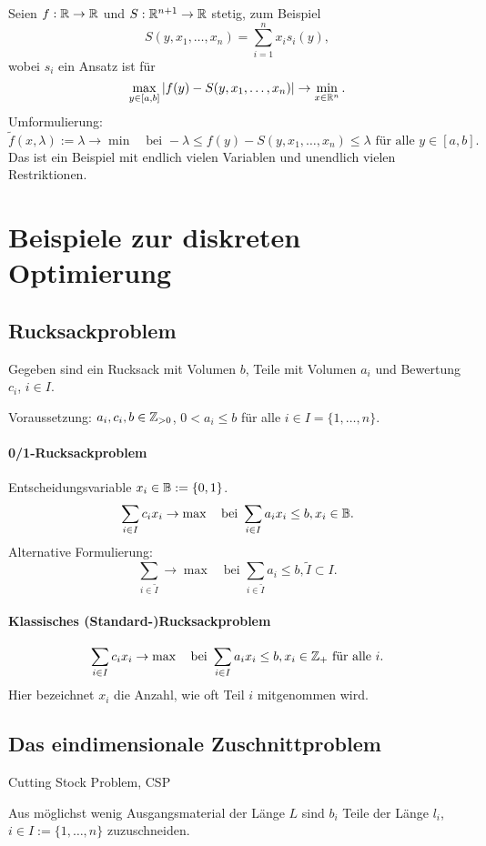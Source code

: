 Seien $f: \mathbb{R} \to \mathbb{R}$ und $S: \mathbb{R}^{n+1} \to \mathbb{R}$ stetig, zum Beispiel
\[ S(y, x_1, \ldots, x_n) = \sum_{i=1}^n x_i s_i(y), \]
wobei $s_i$ ein Ansatz ist für
\[ \max_{y \in [a,b]} | f(y) - S(y, x_1, \ldots, x_n) | \to \min_{x \in
    \mathbb{R}^n}. \]
Umformulierung:
\[ \tilde{f}(x,\lambda) := \lambda \to \min \quad \text{bei } - \lambda \le
  f(y) - S(y, x_1, \ldots, x_n) \le \lambda \text{ für alle } y \in [a,b]. \]
Das ist ein Beispiel mit endlich vielen Variablen und unendlich vielen
Restriktionen.

\section{Beispiele zur diskreten Optimierung}
\subsection{Rucksackproblem}
Gegeben sind ein Rucksack mit Volumen $b$, Teile mit Volumen $a_i$ und Bewertung
$c_i$, $i \in I$.

Voraussetzung: $a_i, c_i, b \in \mathbb{Z}_{>0}$, $0 < a_i \le b$ für alle $i \in
I = \{1, \ldots, n\}$.

\paragraph{0/1-Rucksackproblem}
Entscheidungsvariable $x_i \in \mathbb{B} := \{0,1\}$.
\[ \sum_{i \in I} c_i x_i \to \max \quad \text{bei } \sum_{i \in I} a_i x_i \le
  b, x_i \in \mathbb{B}. \]
Alternative Formulierung:
\[ \sum_{i \in \tilde{I}} \to \max \quad \text{bei } \sum_{i \in \tilde{I}} a_i
  \le b, \tilde{I} \subset I. \]

\paragraph{Klassisches (Standard-)Rucksackproblem}
\[ \sum_{i \in I} c_i x_i \to \max \quad \text{bei } \sum_{i \in I} a_i x_i \le
  b, x_i \in \mathbb{Z}_+ \text{ für alle } i. \]
Hier bezeichnet $x_i$ die Anzahl, wie oft Teil $i$ mitgenommen wird.

\subsection{Das eindimensionale Zuschnittproblem}\label{sect:csp}
Cutting Stock Problem, CSP

Aus möglichst wenig Ausgangsmaterial der Länge $L$ sind $b_i$ Teile der Länge
$l_i$, $i \in I := \{ 1, \ldots, n \}$ zuzuschneiden.

